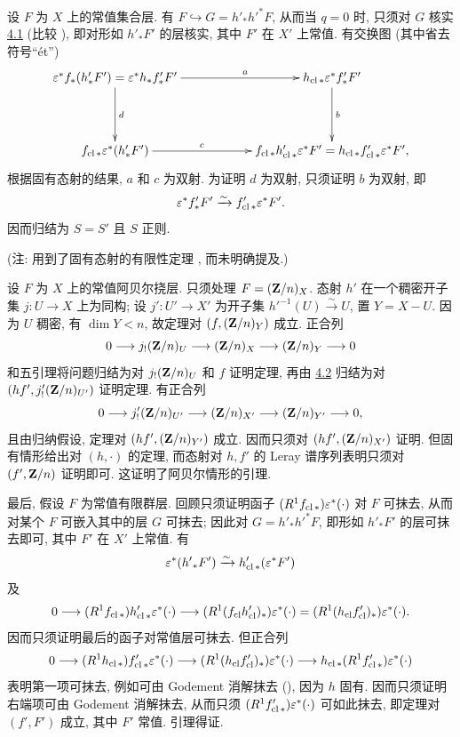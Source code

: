 设 $F$ 为 $X$ 上的常值集合层. 有 $F\hookrightarrow G=h'_*{h'}^*F$, 从而当 $q=0$ 时, 只须对 $G$ 核实 \hyperref[XVI.thm4.1]{4.1} (比较 ), 即对形如 ${h'}_*F'$ 的层核实, 其中 $F'$ 在 $X'$ 上常值. 有交换\pageoriginale 图 (其中省去符号“ét”)
$$
\xymatrix@C=2cm@R=1.5cm{
\varepsilon^*f_* (h'_*F') = \varepsilon^*h_*f'_*F'  \ar[d]^{d}\ar[r]^(.6){a} & h_{\cl *}
	    \varepsilon^*f'_*F' \ar[d]^{b}\\
	    f_{\cl *}\varepsilon^*(h'_*F')  \ar[r]^(.4){c} &
	    f_{\cl *} h'_{\cl *}\varepsilon^*F' = h_{\cl *}f'_{\cl *}
	    \varepsilon^*F',
}
$$
根据固有态射的结果, $a$ 和 $c$ 为双射. 为证明 $d$ 为双射, 只须证明 $b$ 为双射, 即
$$
\varepsilon^*f'_*F'\xrightarrow{\sim}
f'_{\operatorname{cl} *}\varepsilon^*F'.
$$
因而归结为 $S=S'$ 且 $S$ 正则.

\noindent
(注: 用到了固有态射的有限性定理 , 而未明确提及.)

设 $F$ 为 $X$ 上的常值阿贝尔挠层. 只须处理 $F=(\mathbf{Z}/n)_X$. 态射 $h'$ 在一个稠密开子集 $j:U\rightarrow X$ 上为同构; 设 $j':U'\rightarrow X'$ 为开子集 ${h'}^{-1}(U)\xrightarrow{\sim}U$, 置 $Y=X-U$. 因为 $U$ 稠密, 有 $\dim Y<n$, 故定理对 $(f,(\mathbf{Z}/n)_Y)$ 成立. 正合列
$$
0\longrightarrow j_!(\mathbf{Z}/n)_U\longrightarrow
(\mathbf{Z}/n)_X\longrightarrow(\mathbf{Z}/n)_Y\longrightarrow0
$$
和五引理将问题归结为对 $j_!(\mathbf{Z}/n)_U$ 和 $f$ 证明定理, 再由 \hyperref[XVI.lem4.2]{4.2} 归结为对 $(hf',{j'_!}(\mathbf{Z}/n)_{U'})$ 证明定理. 有正合列
$$
0\longrightarrow {j'_!}(\mathbf{Z}/n)_{U'}\longrightarrow
(\mathbf{Z}/n)_{X'}\longrightarrow(\mathbf{Z}/n)_{Y'}\longrightarrow0{},
$$
且\pageoriginale 由归纳假设, 定理对 $(hf',(\mathbf{Z}/n)_{Y'})$ 成立. 因而只须对 $(hf',(\mathbf{Z}/n)_{X'})$ 证明. 但固有情形给出对 $(h,\cdot)$ 的定理, 而态射对 $h,f'$ 的 Leray 谱序列表明只须对 $(f',\mathbf{Z}/n)$ 证明即可. 这证明了阿贝尔情形的引理.

最后, 假设 $F$ 为常值有限群层. 回顾只须证明函子 $(R^1f_{\operatorname{cl} *})\varepsilon^*(\mathord\cdot)$ 对 $F$ 可抹去, 从而对某个 $F$ 可嵌入其中的层 $G$ 可抹去; 因此对 $G={h'}_*{h'}^*F$, 即形如 ${h'}_*F'$ 的层可抹去即可, 其中 $F'$ 在 $X'$ 上常值. 有
$$
\varepsilon^*({h'}_*F')\xrightarrow{\sim}
h'_{\operatorname{cl} *}(\varepsilon^*F')
$$
及
$$
0\longrightarrow
(R^1f_{\operatorname{cl} *})h'_{\operatorname{cl} *}\varepsilon^*(\mathord\cdot)\longrightarrow
(R^1(f_{\operatorname{cl}}h'_{\operatorname{cl}})_*)\varepsilon^*(\mathord\cdot)
=(R^1(h_{\operatorname{cl}}f'_{\operatorname{cl}})_*)\varepsilon^*(\mathord\cdot){}.
$$
因而只须证明最后的函子对常值层可抹去. 但正合列
$$
0\longrightarrow (R^1h_{\operatorname{cl} *})f'_{\operatorname{cl} *}
\varepsilon^*(\mathord\cdot)\longrightarrow
(R^1(h_{\operatorname{cl}}f'_{\operatorname{cl}})_*)\varepsilon^*(\mathord\cdot)\longrightarrow
h_{\operatorname{cl} *}(R^1f'_{\operatorname{cl} *})\varepsilon^*(\mathord\cdot){}
$$
表明第一项可抹去, 例如可由 Godement 消解抹去 (), 因为 $h$ 固有. 因而只须证明右端项可由 Godement 消解抹去, 从而只须 $(R^1f'_{\operatorname{cl} *})\varepsilon^*(\mathord\cdot)$ 可如此抹去, 即定理对 $(f',F')$ 成立, 其中 $F'$ 常值. 引理得证.

